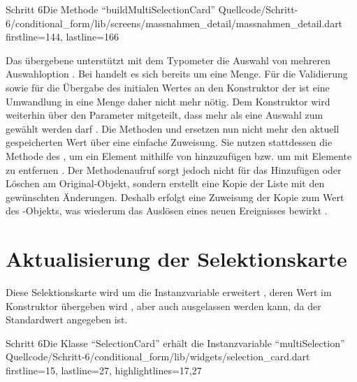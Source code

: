 \begin{alexlisting}{Schritt 6}{Die Methode \enquote{buildMultiSelectionCard}}
  {Quellcode/Schritt-6/conditional_form/lib/screens/massnahmen_detail/massnahmen_detail.dart}
  {firstline=144, lastline=166}
  \label{lst:Schritt6buildMultiSelectionCard}
\end{alexlisting}

Das übergebene  unterstützt mit dem Typometer  die Auswahl von mehreren Auswahloption .
Bei  handelt es sich bereits um eine Menge.
Für die Validierung  sowie für die Übergabe des initialen Wertes an den Konstruktor der   ist eine Umwandlung in eine Menge daher nicht mehr nötig.
Dem Konstruktor  wird weiterhin über den Parameter  mitgeteilt, dass mehr als eine Auswahl zum gewählt werden darf .
Die Methoden  und  ersetzen nun nicht mehr den aktuell gespeicherten Wert über eine einfache Zuweisung.
Sie nutzen stattdessen die Methode  des , um ein Element mithilfe von  hinzuzufügen  bzw. um mit  Elemente zu entfernen .
Der Methodenaufruf  sorgt jedoch nicht für das Hinzufügen oder Löschen am Original-Objekt, sondern erstellt eine Kopie der Liste mit den gewünschten Änderungen.
Deshalb erfolgt eine Zuweisung der Kopie zum Wert des -Objekts, was wiederum das Auslösen eines neuen Ereignisses bewirkt .

\section{Aktualisierung der Selektionskarte}


Diese Selektionskarte wird um die Instanzvariable  erweitert ,
deren Wert im Konstruktor übergeben wird , aber auch ausgelassen werden kann, da der Standardwert  angegeben ist.

\begin{alexlisting}{Schritt 6}{Die Klasse \enquote{SelectionCard} erhält die Instanzvariable \enquote{multiSelection}}
  {Quellcode/Schritt-6/conditional_form/lib/widgets/selection_card.dart}
  {firstline=15, lastline=27, highlightlines={17,27}}
  \label{lst:Schritt6SelectionCard}
\end{alexlisting}


